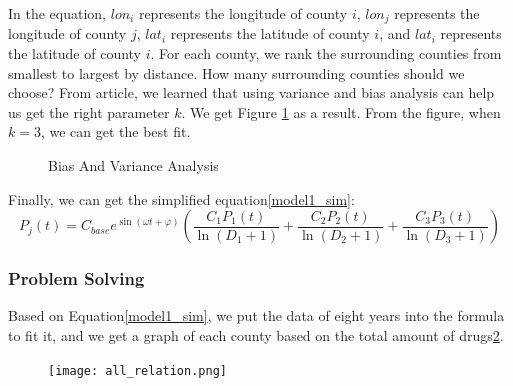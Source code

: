 \documentclass{mcmthesis}
\begin{document}
In the equation, $lon_i$ represents the longitude of county $i$, $lon_j$ represents the longitude of county $j$, $lat_i$ represents the latitude of county $i$, and $lat_i$ represents the latitude of county $i$. For each county, we rank the surrounding counties from smallest to largest by distance. How many surrounding counties should we choose? From article\cite{}, we learned that using variance and bias analysis can help us get the right parameter $k$. We get Figure \ref{model1_bias_variance} as a result. From the figure, when $k = 3$, we can get the best fit.
\begin{figure}[ht]
	\centering
	\caption{Bias And Variance Analysis}\label{model1_bias_variance}	
\end{figure}

Finally, we can get the simplified equation\eqref{model1_sim}:
\begin{equation}
P_{j}(t) = C_{base} e^{\sin (\omega t+\varphi)} \left(\frac{C_1 P_1(t)}{\ln (D_1+1)}+\frac{C_2 P_2(t)}{\ln (D_2+1)}+\frac{C_3 P_3(t)}{\ln (D_3+1)}\right)
\label{model1_sim}
\end{equation}
\subsubsection{Problem Solving}
Based on Equation\eqref{model1_sim}, we put the data of eight years into the formula to fit it, and we get a graph of each county based on the total amount of drugs\ref{all_relation}.
\begin{figure}[ht]
	\centering
	\texttt{[image: all\_relation.png]}
	\caption{}\label{all_relation}
\end{figure}
\end{document}
